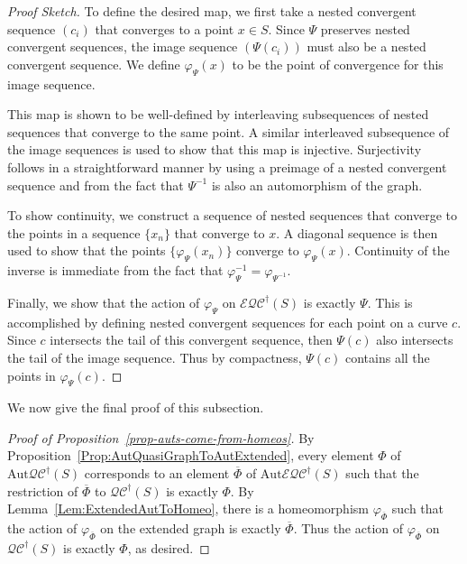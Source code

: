 \documentclass[12pt,a4paper]{amsart}
\theoremstyle{definition}
\theoremstyle{plain}
\numberwithin{equation}{section}
\newcommand{\qcg}{\mathcal{QC}^{\dagger}}
\newcommand{\eqcg}{\mathcal{E\!QC}^{\dagger}}
\newcommand{\Aut}{\mathrm{Aut}}
\begin{document}
\begin{proof}[Proof Sketch]
    To define the desired map, we first take a nested convergent sequence $(c_i)$ that converges to a point $x \in S$.  Since $\Psi$ preserves nested convergent sequences, the image sequence $(\Psi(c_i))$ must also be a nested convergent sequence.  We define $\varphi_{\Psi}(x)$ to be the point of convergence for this image sequence. 
	
    This map is shown to be well-defined by interleaving subsequences of nested sequences that converge to the same point.  A similar interleaved subsequence of the image sequences is used to show that this map is injective.  Surjectivity follows in a straightforward manner by using a preimage of a nested convergent sequence and from the fact that $\Psi^{-1}$ is also an automorphism of the graph.
	
    To show continuity, we  construct a sequence of nested sequences that converge to the points in a sequence $\{x_n\}$ that converge to $x$.  A diagonal sequence is then used to show that the points $\{\varphi_{\Psi}(x_n)\}$  converge to $\varphi_{\Psi}(x)$.  Continuity of the inverse is immediate from the fact that $\varphi_{\Psi}^{-1} = \varphi_{\Psi^{-1}}$.
	
    Finally,  we  show that the action of $\varphi_{\Psi}$ on $\eqcg(S)$ is exactly $\Psi$. This is accomplished by defining nested convergent sequences for each point on a curve $c$.  Since $c$ intersects the tail of this convergent sequence, then $\Psi(c)$  also intersects the tail of the image sequence.  Thus by compactness, $\Psi(c)$  contains all the points in $\varphi_{\Psi}(c)$. 
\end{proof}

We now give the final proof of this subsection.

\begin{proof}[Proof of Proposition~\ref{prop-auts-come-from-homeos}]
    By Proposition~\ref{Prop:AutQuasiGraphToAutExtended},  every element $\Phi$ of $\Aut \qcg(S)$ corresponds to an element $\overline{\Phi}$ of $\Aut \eqcg(S)$ such that the restriction of $\overline{\Phi}$ to $\qcg(S)$ is exactly $\Phi$.  By Lemma~\ref{Lem:ExtendedAutToHomeo},  there is a homeomorphism $\varphi_{\overline{\Phi}}$ such that the action of $\varphi_{\overline{\Phi}}$ on the extended graph is exactly $\overline{\Phi}$.  Thus the action of $\varphi_{\overline{\Phi}}$ on $\qcg(S)$ is exactly $\Phi$, as desired.
\end{proof}
\end{document}
